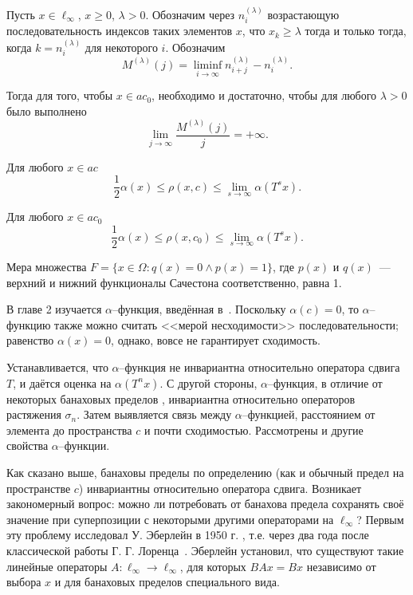 	Пусть $x\in\ell_\infty$, $x \geq 0$, $\lambda>0$.
	Обозначим через $n^{(\lambda)}_i$ возрастающую последовательность
	индексов таких элементов $x$, что $x_k \geq \lambda$ тогда и только тогда,
	когда $k=n^{(\lambda)}_i$ для некоторого $i$.
	Обозначим
	\begin{equation}
		M^{(\lambda)}(j) = \liminf_{i\to\infty} n^{(\lambda)}_{i+j} - n^{(\lambda)}_i
		.
	\end{equation}


	Тогда для того, чтобы $x\in ac_0$, необходимо и достаточно, чтобы
	для любого $\lambda>0$ было выполнено
	\begin{equation}
		\lim_{j \to \infty} \frac{M^{(\lambda)}(j)}{j} = +\infty
		.
	\end{equation}

	Для любого $x\in ac$
	\begin{equation}
		\frac{1}{2} \alpha(x) \leq \rho(x,c)\leq \lim_{s\to\infty} \alpha(T^s x)
		.
	\end{equation}

	Для любого $x\in ac_0$
	\begin{equation}
		\frac{1}{2} \alpha(x) \leq \rho(x,c_0)\leq \lim_{s\to\infty} \alpha(T^s x)
		.
	\end{equation}

	Мера множества $F=\{x\in\Omega : q(x) = 0 \wedge p(x)= 1\}$,
	где $p(x)$ и $q(x)$~--- верхний и нижний функционалы Сачестона соответственно,
	равна 1.


В главе 2
изучается $\alpha$--функция, введённая в~\cite{our-vzms-2018}.
%
%
Поскольку $\alpha(c)=0$,
то $\alpha$--функцию также можно считать <<мерой несходимости>> последовательности;
равенство $\alpha(x) = 0$, однако, вовсе не гарантирует сходимость.

Устанавливается, что $\alpha$--функция не инвариантна относительно оператора сдвига $T$,
и даётся оценка на $\alpha(T^n x)$.
С другой стороны, $\alpha$--функция, в отличие от некоторых банаховых пределов
\cite{Semenov2010invariant,Semenov2011dan},
инвариантна относительно операторов растяжения $\sigma_n$.
Затем выявляется связь между $\alpha$--функцией, расстоянием от элемента до пространства $c$
и почти сходимостью.
Рассмотрены и другие свойства $\alpha$--функции.




Как сказано выше, банаховы пределы по определению (как и обычный предел на пространстве $c$) инвариантны относительно оператора сдвига.
Возникает закономерный вопрос: можно ли потребовать от банахова предела сохранять своё значение
при суперпозиции с некоторыми другими операторами на $\ell_\infty$?
Первым эту проблему исследовал У. Эберлейн в 1950 г. \cite{Eberlein},
т.е. через два года после классической работы Г. Г. Лоренца~\cite{lorentz1948contribution}.
Эберлейн установил, что существуют такие линейные операторы  $A : \ell_\infty\to \ell_\infty$,
для которых $BAx = Bx$ независимо от выбора $x$ и для банаховых пределов специального вида.

